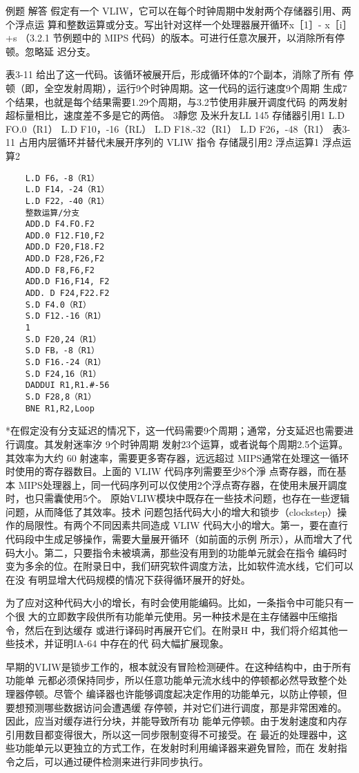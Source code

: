 例题
解答
假定有一个 VLIW，它可以在每个时钟周期中发射两个存储器引用、两个浮点运
算和整数运算或分支。写出针对这样一个处理器展开循环x［1］- x［i］+s （3.2.1
节例题中的 MIPS 代码）的版本。可进行任意次展开，以消除所有停顿。忽略延
迟分支。

表3-11 给出了这一代码。该循环被展开后，形成循环体的7个副本，消除了所有
停顿（即，全空发射周期），运行9个时钟周期。这一代码的运行速度9个周期
生成7个结果，也就是每个结果需要1.29个周期，与3.2节使用非展开调度代码
的两发射超标量相比，速度差不多是它的两倍。
3靜您 及米升友LL
145
存储器引用1
L.D FO.0（R1）
L.D F10，-16（RL）
L.D F18.-32（R1）
L.D F26，-48（R1）
表3-11 占用内层循环并替代未展开序列的 VLIW 指令
存储晟引用2
浮点运算1
浮点运算2
\begin{verbatim}
    L.D F6，-8（R1）
    L.D F14，-24（R1）
    L.D F22，-40（R1）
    整数运算/分支
    ADD.D F4.FO.F2
    ADD.0 F12.F10,F2
    ADD.D F20,F18.F2
    ADD.D F28,F26,F2
    ADD.D F8,F6,F2
    ADD.D F16,F14, F2
    ADD. D F24,F22.F2
    S.D F4.0（RI）
    S.D F12.-16（R1）
    1
    S.D F20,24（R1）
    S.D FB，-8（R1）
    S.D F16.-24（R1）
    S.D F24,16（R1）
    DADDUI R1,R1.#-56
    S.D F28,8（R1）
    BNE R1,R2,Loop
\end{verbatim}
*在假定没有分支延迟的情况下，这一代码需要9个周期；通常，分支延迟也需要进行调度。其发射迷率汐 9个时钟周期
发射23个运算，或者说每个周期2.5个运算。其效率为大约 60%
射速率，需要更多寄存器，远远超过 MIPS通常在处理这一循环时使用的寄存器数目。上面的 VLIW 代码序列需要至少8个淨
点寄存器，而在基本 MIPS处理器上，同一代码序列可以仅使用2个浮点寄存器，在使用未展开調度时，也只需囊使用5个。
原始VLIW模块中既存在一些技术问题，也存在一些逻辑问题，从而降低了其效率。技术
问题包括代码大小的增大和锁步（clockstep）操作的局限性。有两个不同因素共同造成 VLIW
代码大小的增大。第一，要在直行代码段中生成足够操作，需要大量展开循环（如前面的示例
所示），从而增大了代码大小。第二，只要指令未被填满，那些没有用到的功能单元就会在指令
编码时变为多余的位。在附录日中，我们研究软件调度方法，比如软件流水线，它们可以在没
有明显增大代码规模的情况下获得循环展开的好处。

为了应对这种代码大小的增长，有时会使用能编码。比如，一条指令中可能只有一个很
大的立即数字段供所有功能单元使用。另一种技术是在主存储器中压缩指令，然后在到达缓存
或进行译码时再展开它们。在附录H 中，我们将介绍其他一些技术，并证明IA-64 中存在的代
码大幅扩展现象。

早期的VLIW是锁步工作的，根本就没有冒险检测硬件。在这种结构中，由于所有功能单
元都必须保持同步，所以任意功能单元流水线中的停顿都必然导致整个处理器停顿。尽管个
编译器也许能够调度起决定作用的功能单元，以防止停顿，但要想预测哪些数据访问会遭遇缓
存停顿，并对它们进行调度，那是非常困难的。因此，应当对缓存进行分块，并能导致所有功
能单元停顿。由于发射速度和内存引用数目都变得很大，所以这一同步限制变得不可接受。在
最近的处理器中，这些功能单元以更独立的方式工作，在发射时利用编译器来避免冒险，而在
发射指令之后，可以通过硬件检测来进行非同步执行。

